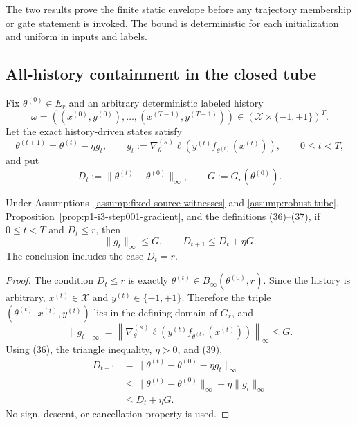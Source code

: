 The two results prove the finite static envelope before any trajectory
membership or gate statement is invoked.  The bound is deterministic for each
initialization and uniform in inputs and labels.

\subsection{All-history containment in the closed tube}
\label{app:step002-containment}

Fix $\theta^{(0)}\in E_r$ and an arbitrary deterministic labeled history
\[
\omega=((x^{(0)},y^{(0)}),\ldots,(x^{(T-1)},y^{(T-1)}))
\in(\mathcal X\times\{-1,+1\})^T.
\]
Let the exact history-driven states satisfy
\[
\theta^{(t+1)}=\theta^{(t)}-\eta g_t,
\qquad
g_t:=\nabla_\theta^{(\kappa)}
\ell(y^{(t)}f_{\theta^{(t)}}(x^{(t)})),
\qquad0\leq t<T,
\tag{36}
\]
and put
\[
D_t:=\|\theta^{(t)}-\theta^{(0)}\|_\infty,
\qquad G:=G_r(\theta^{(0)}).
\tag{37}
\]

\begin{lemma}
\label{lem:p1-i3-step002-one-step}
Under Assumptions~\ref{assump:fixed-source-witnesses} and
\ref{assump:robust-tube}, Proposition~\ref{prop:p1-i3-step001-gradient},
and the definitions (36)--(37), if $0\leq t<T$ and $D_t\leq r$, then
\[
\|g_t\|_\infty\leq G,
\qquad D_{t+1}\leq D_t+\eta G.
\tag{38}
\]
The conclusion includes the case $D_t=r$.
\end{lemma}

\begin{proof}
The condition $D_t\leq r$ is exactly
$\theta^{(t)}\in B_\infty(\theta^{(0)},r)$.  Since the history is arbitrary,
$x^{(t)}\in\mathcal X$ and $y^{(t)}\in\{-1,+1\}$.  Therefore the triple
$(\theta^{(t)},x^{(t)},y^{(t)})$ lies in the defining domain of $G_r$, and
\[
\|g_t\|_\infty
=\left\|\nabla_\theta^{(\kappa)}
\ell(y^{(t)}f_{\theta^{(t)}}(x^{(t)}))\right\|_\infty\leq G.
\tag{39}
\]
Using (36), the triangle inequality, $\eta>0$, and (39),
\[
\begin{aligned}
D_{t+1}
&=\|\theta^{(t)}-\theta^{(0)}-\eta g_t\|_\infty\\
&\leq\|\theta^{(t)}-\theta^{(0)}\|_\infty+\eta\|g_t\|_\infty\\
&\leq D_t+\eta G.
\end{aligned}
\tag{40}
\]
No sign, descent, or cancellation property is used.
\end{proof}

